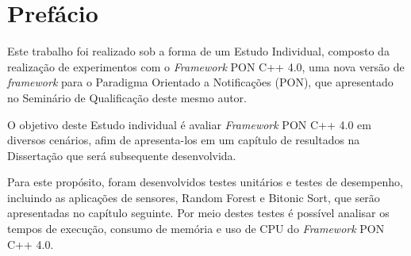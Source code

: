 \chapter{Prefácio}

Este trabalho foi realizado sob a forma de um Estudo Individual, composto da
realização de experimentos com o \textit{Framework} PON C++ 4.0, uma nova versão
de \textit{framework} para o Paradigma Orientado a Notificações (PON), que
apresentado no Seminário de Qualificação deste mesmo autor.

O objetivo deste Estudo individual é avaliar \textit{Framework} PON C++ 4.0 em
diversos cenários, afim de apresenta-los em um capítulo de resultados na
Dissertação que será subsequente desenvolvida. 

Para este propósito, foram desenvolvidos testes unitários e testes de
desempenho, incluindo as aplicações de sensores, Random Forest e Bitonic Sort,
que serão apresentadas no capítulo seguinte. Por meio destes testes é possível
analisar os tempos de execução, consumo de memória e uso de CPU do
\textit{Framework} PON C++ 4.0.